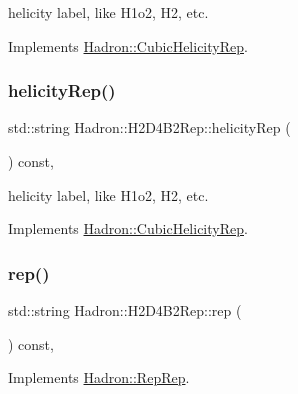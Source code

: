 helicity label, like H1o2, H2, etc. 

Implements \mbox{\hyperlink{structHadron_1_1CubicHelicityRep_af1096946b7470edf0a55451cc662f231}{Hadron\+::\+Cubic\+Helicity\+Rep}}.

\mbox{\label{structHadron_1_1H2D4B2Rep_a1ec65d13eaf3747ef59295d3cd1aa002}} 
\subsubsection{\texorpdfstring{helicityRep()}{helicityRep()}\hspace{0.1cm}{\footnotesize\ttfamily [3/3]}}
{\footnotesize\ttfamily std\+::string Hadron\+::\+H2\+D4\+B2\+Rep\+::helicity\+Rep (\begin{DoxyParamCaption}{ }\end{DoxyParamCaption}) const\hspace{0.3cm}{\ttfamily [inline]}, {\ttfamily [virtual]}}

helicity label, like H1o2, H2, etc. 

Implements \mbox{\hyperlink{structHadron_1_1CubicHelicityRep_af1096946b7470edf0a55451cc662f231}{Hadron\+::\+Cubic\+Helicity\+Rep}}.

\mbox{\label{structHadron_1_1H2D4B2Rep_a8d556a242b6426bf15612422a8e22ce6}} 
\subsubsection{\texorpdfstring{rep()}{rep()}\hspace{0.1cm}{\footnotesize\ttfamily [1/5]}}
{\footnotesize\ttfamily std\+::string Hadron\+::\+H2\+D4\+B2\+Rep\+::rep (\begin{DoxyParamCaption}{ }\end{DoxyParamCaption}) const\hspace{0.3cm}{\ttfamily [inline]}, {\ttfamily [virtual]}}



Implements \mbox{\hyperlink{structHadron_1_1RepRep_ab3213025f6de249f7095892109575fde}{Hadron\+::\+Rep\+Rep}}.

\mbox{\label{structHadron_1_1H2D4B2Rep_a8d556a242b6426bf15612422a8e22ce6}} 
